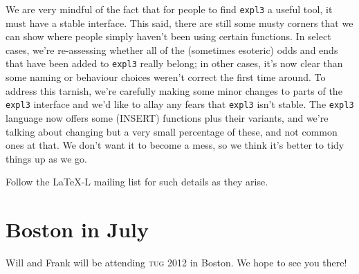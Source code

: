 \documentclass{ltnews}
\begin{document}
We are very mindful of the fact that for people to find \texttt{expl3} a useful tool, it must have a stable interface.
This said, there are still some musty corners that we can show where people simply haven't been using certain functions.
In select cases, we're re-assessing whether all of the (sometimes esoteric) odds and ends that have been added to \texttt{expl3} really belong; in other cases, it's now clear than some naming or behaviour choices weren't correct the first time around.
To address this tarnish, we're carefully making some minor changes to parts of the \texttt{expl3} interface and we'd like to allay any fears that \texttt{expl3} isn't stable.
The \texttt{expl3} language now offers some (INSERT) functions plus their variants, and we're talking about changing but a very small percentage of these, and not common ones at that.
We don't want it to become a mess, so we think it's better to tidy things up as we go.

Follow the LaTeX-L mailing list for such details as they arise.


\section{Boston in July}

Will and Frank
will
be attending \textsc{tug} 2012 in Boston.
We hope to see you there!
\end{document}
